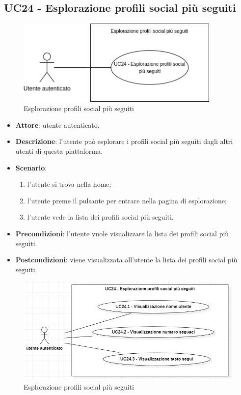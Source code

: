 \subsection{UC24 - Esplorazione profili social più seguiti}

\begin{figure}[!h]
    \includegraphics[width=10cm]{sezioni/Images/UC24.png}
    \centering
    \caption{Esplorazione profili social più seguiti}
\end{figure}

\begin{itemize}
    \item \textbf{Attore}: utente autenticato.
    \item \textbf{Descrizione}: l'utente può esplorare i profili social più seguiti dagli altri utenti di questa piattaforma.
    \item \textbf{Scenario}:
    \begin{enumerate}
        \item l'utente si trova nella home;
        \item l'utente preme il pulsante per entrare nella pagina di esplorazione;
        \item l'utente vede la lista dei profili social più seguiti.
    \end{enumerate}
    \item \textbf{Precondizioni}: l'utente vuole visualizzare la lista dei profili social più seguiti.
    \item \textbf{Postcondizioni}: viene visualizzata all'utente la lista dei profili social più seguiti.
\end{itemize}

\begin{figure}[H]
    \includegraphics[width=13cm]{sezioni/Images/UC24_s.png}
    \centering
    \caption{Esplorazione profili social più seguiti}
\end{figure}

